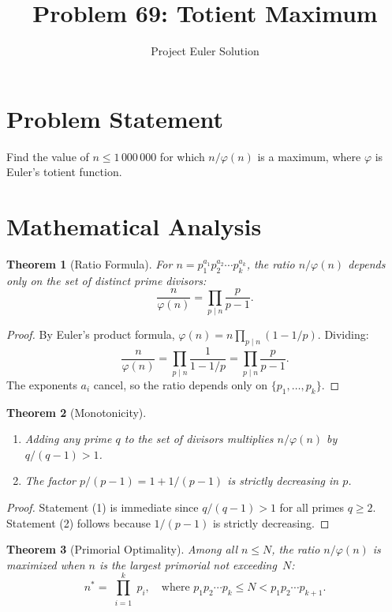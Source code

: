 \documentclass[12pt,a4paper]{article}
\title{Problem 69: Totient Maximum}
\author{Project Euler Solution}
\date{}
\newtheorem{theorem}{Theorem}
\begin{document}
\maketitle

\section{Problem Statement}

Find the value of $n \le 1\,000\,000$ for which $n / \varphi(n)$ is a maximum, where $\varphi$ is Euler's totient function.

\section{Mathematical Analysis}

\begin{theorem}[Ratio Formula]
For $n = p_1^{a_1} p_2^{a_2} \cdots p_k^{a_k}$, the ratio $n/\varphi(n)$ depends only on the set of distinct prime divisors:
\[
\frac{n}{\varphi(n)} = \prod_{p \mid n} \frac{p}{p - 1}.
\]
\end{theorem}

\begin{proof}
By Euler's product formula, $\varphi(n) = n \prod_{p \mid n}(1 - 1/p)$. Dividing:
\[
\frac{n}{\varphi(n)} = \prod_{p \mid n} \frac{1}{1 - 1/p} = \prod_{p \mid n} \frac{p}{p-1}.
\]
The exponents $a_i$ cancel, so the ratio depends only on $\{p_1, \ldots, p_k\}$.
\end{proof}

\begin{theorem}[Monotonicity]
\begin{enumerate}
    \item Adding any prime $q$ to the set of divisors multiplies $n/\varphi(n)$ by $q/(q-1) > 1$.
    \item The factor $p/(p-1) = 1 + 1/(p-1)$ is strictly decreasing in $p$.
\end{enumerate}
\end{theorem}

\begin{proof}
Statement (1) is immediate since $q/(q-1) > 1$ for all primes $q \geq 2$. Statement (2) follows because $1/(p-1)$ is strictly decreasing.
\end{proof}

\begin{theorem}[Primorial Optimality]
Among all $n \leq N$, the ratio $n/\varphi(n)$ is maximized when $n$ is the largest primorial not exceeding~$N$:
\[
n^* = \prod_{\substack{i=1}}^{k} p_i, \quad \text{where } p_1 p_2 \cdots p_k \leq N < p_1 p_2 \cdots p_{k+1}.
\]
\end{theorem}
\end{document}
